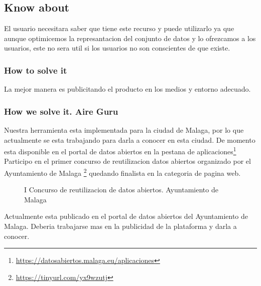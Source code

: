 \subsection{Know about}

El usuario necesitara saber que tiene este recurso y puede utilizarlo ya que aunque optimicemos la represantacion del 
conjunto de datos y lo ofrezcamos a los usuarios, este no sera util si los usuarios no son conscientes de que existe.
\subsubsection{How to solve it} 
La mejor manera es publicitando el producto en los medios y entorno adecuado.
\subsubsection{How we solve it. Aire Guru} 
Nuestra herramienta esta implementada para la ciudad de Malaga, por lo que actualmente se esta trabajando para darla a 
conocer en esta ciudad.
De momento esta disponible en el portal de datos abiertos en la pestana de aplicaciones\footnote{\url{https://datosabiertos.malaga.eu/aplicaciones}}\\
Participo en el primer concurso de reutilizacion datos abiertos organizado por el Ayuntamiento de Malaga \footnote{\url{https://tinyurl.com/yx9wzutj}}
quedando finalista en la categoria de pagina web.



\begin{figure}[ht]
    \centering
   \hfill
 
    \caption{I Concurso de reutilizacion de datos abiertos. Ayuntamiento de Malaga}
    \end{figure}

\begin{itemize}
\done Actualmente esta publicado en el portal de datos abiertos del Ayuntamiento de Malaga.
\crossed Deberia trabajarse mas en la publicidad de la plataforma y darla a conocer.  
\end{itemize}
\newpage